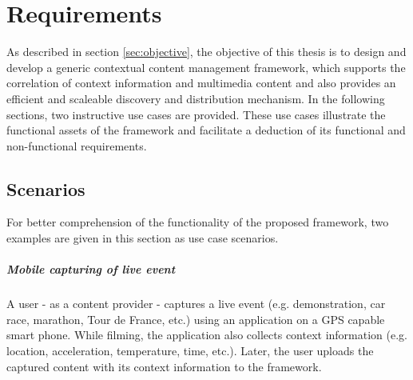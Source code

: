 \chapter{Requirements\label{cha:chapter3}}
As described in section \ref{sec:objective}, the objective of this thesis is to design and develop a generic contextual content management framework, which supports the correlation of context information and multimedia content and also provides an efficient and scaleable discovery and distribution mechanism. In the following sections, two instructive use cases are provided. These use cases illustrate the functional assets of the framework and facilitate a deduction of its functional and non-functional requirements.
 
%
% 
 
\section{Scenarios\label{sec:req_sce}}

For better comprehension of the functionality of the proposed framework, two examples are given in this section as use case scenarios.

\paragraph{Mobile capturing of live event}

A user - as a content provider - captures a live event (e.g. demonstration, car race, marathon, Tour de France, etc.) using an application on a \ac{GPS} capable smart phone. While filming, the application also collects context information (e.g. location, acceleration, temperature, time, etc.). Later, the user uploads the captured content with its context information to the framework.

